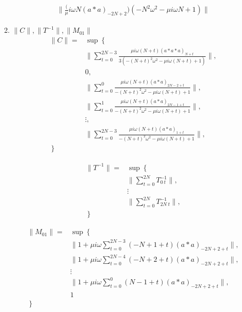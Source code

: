 \documentclass[11pt,a4paper]{jsarticle}
\theoremstyle{definition}
\begin{document}
\begin{equation}
  \begin{split}
    \| \frac(\mu i \omega N (a*a)_{-2N+2})(-N^2 \omega^2 - \mu i \omega N + 1) \|
  \end{split}
\end{equation}


2. $\|C\|, \|T^{-1}\|, \|M_{01}\|$
\begin{equation}
  \begin{split}
    \|C\| =& \sup \left\lbrace \right. \\
    & \| \sum_{t=0}^{2N-3} \frac{\mu i \omega (N+t) (a*a*a)_{N+t}}{3(-(N+t)^2 \omega^2 - \mu i \omega (N+t)+ 1)} \|,\\
    & 0,\\
    & \| \sum_{t=0}^{0} \frac{ \mu i \omega (N+t) (a*a)_{2N-2 + t}}{-(N+t)^2 \omega^2 - \mu i \omega (N+t)+ 1} \|,\\
    & \| \sum_{t=0}^{1} \frac{ \mu i \omega (N+t) (a*a)_{2N-1 + t} }{-(N+t)^2 \omega^2 - \mu i \omega (N+t)+ 1}\|,\\
    & \vdots , \\
    & \| \sum_{t=0}^{2N-3} \frac{ \mu i \omega (N+t) (a*a)_{1 + t} }{-(N+t)^2 \omega^2 - \mu i \omega (N+t)+ 1}\|,\\
    \left. \right\rbrace&
  \end{split}
\end{equation}


\begin{equation}
  \begin{split}
    \|T^{-1}\| =& \sup \left\lbrace \right. \\
    & \|\sum_{t=0}^{2N} T_{0\ t}^{-1}\|, \\
    & \vdots \\
    & \|\sum_{t=0}^{2N} T_{2N\ t}^{-1}\|, \\
    \left. \right\rbrace&
  \end{split}
\end{equation}

\begin{equation}
  \begin{split}
    \|M_{01}\| =& \sup \left\lbrace \right. \\
    &\| 1 + \mu i \omega \sum_{t=0}^{2N-3} (-N+1 + t) (a*a)_{-2N+2+t} \| , \\
    &\| 1 + \mu i \omega \sum_{t=0}^{2N-4} (-N+2 + t) (a*a)_{-2N+2+t} \| , \\
    & \vdots \\
    &\| 1 + \mu i \omega \sum_{t=0}^{0} (N-1 + t) (a*a)_{-2N+2+t} \| , \\
    & 1 \\
    \left. \right\rbrace&
  \end{split}
\end{equation}
\end{document}
